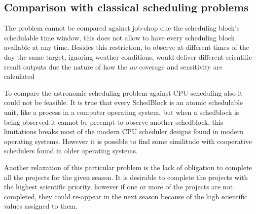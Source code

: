 \documentclass[11pt]{article}
\begin{document}
\subsection{Comparison with classical scheduling problems}

The problem cannot be compared against job-shop due the scheduling block's schedulable time window, this does not allow to have every scheduling block available at any time. Besides this restriction, to observe at different times of the day the same target, ignoring weather conditions, would deliver different scientific result outputs due the nature of how the $uv$ coverage and sensitivity are calculated

To compare the astronomic scheduling problem against CPU scheduling also it could not be feasible. It is true that every SchedBlock is an atomic schedulable unit, like a process in a computer operating system, but when a schedblock is being observed it cannot be preempt to observe another schedblock, this limitations breaks most of the modern CPU scheduler designs found in modern operating systems. However it is possible to find some similitude with cooperative schedulers found in older operating systems. 

Another relaxation of this particular problem is the lack of obligation to complete all the projects for the given season. It is desirable to complete the projects with the highest scientific priority, however if one or more of the projects are not completed, they could re-appear in the next season because of the high scientific values assigned to them.
\end{document}
